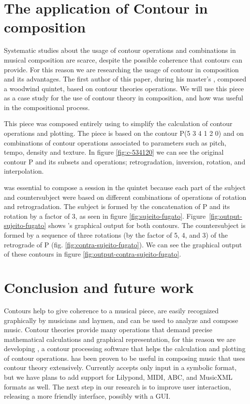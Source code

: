 \documentclass[a0paper]{sciposter}
\begin{document}
\begin{multicols}{3}

\section{The application of Contour in composition}

Systematic studies about the usage of contour operations and
combinations in musical composition are scarce, despite the possible
coherence that contours can provide. For this reason we are
researching the usage of contour in composition and its advantages.
The first author of this paper, during his master's
\cite{sampaio08:em}, composed a woodwind quintet,
based on contour theories operations. We will use this piece as a case
study for the use of contour theory in composition, and how \goiaba{}
was useful in the compositional process.

This piece
was composed entirely using \goiaba{} to simplify the calculation of
contour operations and plotting. The piece is based on the contour P(5
3 4 1 2 0) and on combinations of contour operations associated to
parameters such as pitch, tempo, density and texture. In figure
\ref{fig:c-534120} we can see the original contour P and its subsets
and operations; retrogradation, inversion, rotation, and
interpolation.

\goiaba{} was essential to compose a  session in the
quintet because each part of the subject and countersubject were based
on different combinations of operations of rotation and
retrogradation. The subject is formed by the concatenation of P and
its rotation by a factor of 3, as seen in figure
\ref{fig:sujeito-fugato}. Figure~\ref{fig:output-sujeito-fugato} shows
\goiaba{}'s graphical output for both contours. The countersubject is
formed by a sequence of three rotations (by the factor of 5, 4, and 3)
of the retrograde of P (fig. \ref{fig:contra-sujeito-fugato}). We can
see the graphical output of these contours in figure
\ref{fig:output-contra-sujeito-fugato}.

\section{Conclusion and future work}

Contours help to give coherence to a musical piece, are easily
recognized graphically by musicians and laymen, and can be used to
analyze and compose music. Contour theories provide many operations
that demand precise mathematical calculations and graphical
representation, for this reason we are developing \goiaba{}, a contour
processing software that helps the calculation and plotting of contour
operations. \goiaba{} has been proven to be useful in composing music
that uses contour theory extensively. Currently \goiaba{} accepts only
input in a symbolic format, but we have plans to add support for
Lilypond, MIDI, ABC, and MusicXML formats as well. The next step in
our research is to improve \goiaba{} user interaction, releasing a
more friendly interface, possibly with a GUI.


\end{multicols}
\end{document}
